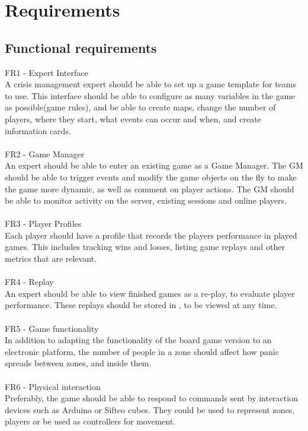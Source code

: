 \chapter{Requirements}
\section{Functional requirements}


FR1 - Expert Interface\\
A crisis management expert should be able to set up a game template for teams to use. This interface should be able to configure as many variables in the game as possible(game rules), and be able to create maps, change the number of players, where they start, what events can occur and when, and create information cards.\\
\\
FR2 - Game Manager\\
An expert should be able to enter an existing game as a Game Manager. The GM should be able to trigger events and modify the game objects on the fly to make the game more dynamic, as well as comment on player actions. The GM should be able to monitor activity on the server, existing sessions and online players.\\
\\
FR3 - Player Profiles\\
Each player should have a profile that records the players performance in played games. This includes tracking wins and losses, listing game replays and other metrics that are relevant.\\
\\
FR4 - Replay\\
An expert should be able to view finished games as a re-play, to evaluate player performance. These replays should be stored in , to be viewed at any time.\\
\\
FR5 - Game functionality\\
In addition to adapting the functionality of the board game version to an electronic platform, the number of people in a zone should affect how panic spreads between zones, and inside them. \\
\\
FR6 - Physical interaction\\
Preferably, the game should be able to respond to commands sent by interaction devices such as Arduino or Sifteo cubes. They could be used to represent zones, players or be used as controllers for movement.\\
\\


